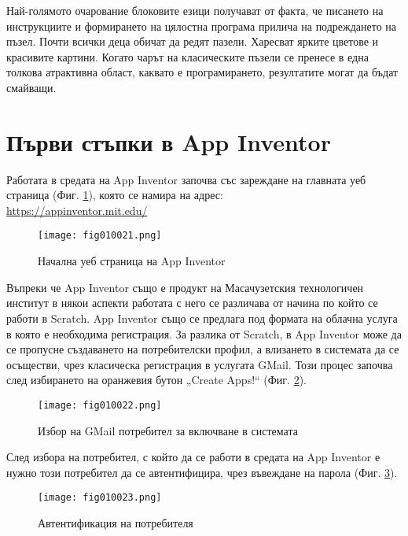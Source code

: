 Най-голямото очарование блоковите езици получават от факта, че писането на инструкциите и формирането на цялостна програма прилича на подреждането на пъзел. Почти всички деца обичат да редят пазели. Харесват ярките цветове и красивите картини. Когато чарът на класическите пъзели се пренесе в една толкова атрактивна област, каквато е програмирането, резултатите могат да бъдат смайващи. 

\section{Първи стъпки в App Inventor}

Работата в средата на App Inventor започва със зареждане на главната уеб страница (Фиг. \ref{fig010021}), която се намира на адрес: \\ \href{https://appinventor.mit.edu/}{https://appinventor.mit.edu/}

\begin{figure}[H]
  \centering
  \texttt{[image: fig010021.png]}
  \caption{Начална уеб страница на App Inventor}
\label{fig010021}
\end{figure}

Въпреки че App Inventor също е продукт на Масачузетския технологичен институт в някои аспекти работата с него се различава от начина по който се работи в Scratch. App Inventor също се предлага под формата на облачна услуга в която е необходима регистрация. За разлика от  Scratch, в App Inventor може да се пропусне създаването на потребителски профил, а влизането в системата да се осъществи, чрез класическа регистрация в услугата GMail. Този процес започва след избирането на оранжевия бутон „Create Apps!“ (Фиг. \ref{fig010022}).

\begin{figure}[H]
  \centering
  \texttt{[image: fig010022.png]}
  \caption{Избор на GMail потребител за включване в системата}
\label{fig010022}
\end{figure}

След избора на потребител, с който да се работи в средата на App Inventor е нужно този потребител да се автентифицира, чрез въвеждане на парола (Фиг. \ref{fig010023}).

\begin{figure}[H]
  \centering
  \texttt{[image: fig010023.png]}
  \caption{Автентификация на потребителя}
\label{fig010023}
\end{figure}

